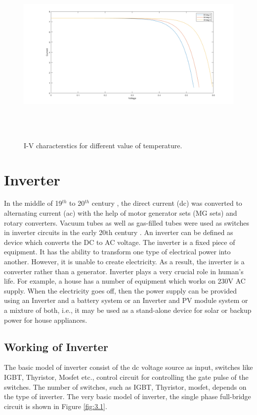 \documentclass[a4paper,12pt]{iitmdiss}
\begin{document}
\begin{figure}[hbt!]
    \centering
    \includegraphics[width=16cm,height=9cm]{I-V for diff temp(1).png}
    \caption{I-V characterstics for different value of temperature.}
    \label{fig:2.7}
\end{figure}



\chapter{Inverter}\label{chap:inverter}

In the middle of 19$^{th}$ to 20$^{th}$ century , the direct current (dc) was converted to alternating current (ac) with the help of motor generator sets (MG sets) and rotary converters. Vacuum tubes as well as gas-filled tubes were used as switches in inverter circuits in the early 20th century \textcolor{blue}{\cite{*_2019}}. An inverter can be defined as device which converts the DC to AC voltage. The inverter is a fixed piece of equipment. It has the ability to transform one type of electrical power into another. However, it is unable to create electricity. As a result, the inverter is a converter rather than a generator. Inverter plays a very crucial role in human's life. For example, a house has a number of equipment which works on 230V AC supply. When the electricity goes off, then the power supply can be provided using an Inverter and a battery system or an Inverter and PV module system or a mixture of both, i.e., it may be used as a stand-alone device for solar or backup power for house appliances. 


\section{Working of Inverter}
The basic model of inverter consist of the dc voltage source as input, switches like IGBT, Thyristor, Mosfet etc., control circuit for controlling the gate pulse of the switches. The number of switches, such as IGBT, Thyristor, mosfet, depends on the type of inverter. The very basic model of inverter, the single phase full-bridge circuit is shown in Figure \ref{fig:3.1}. 
\end{document}
